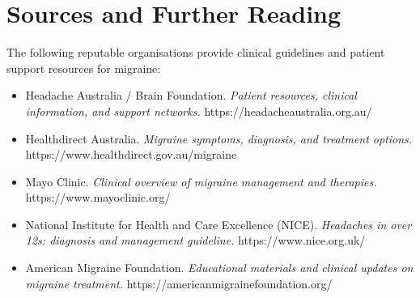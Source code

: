 \section*{Sources and Further Reading}
The following reputable organisations provide clinical guidelines and patient support resources for migraine:
\begin{itemize}
    \item Headache Australia / Brain Foundation. \textit{Patient resources, clinical information, and support networks.} https://headacheaustralia.org.au/
    \item Healthdirect Australia. \textit{Migraine symptoms, diagnosis, and treatment options.} https://www.healthdirect.gov.au/migraine
    \item Mayo Clinic. \textit{Clinical overview of migraine management and therapies.} https://www.mayoclinic.org/
    \item National Institute for Health and Care Excellence (NICE). \textit{Headaches in over 12s: diagnosis and management guideline.} https://www.nice.org.uk/
    \item American Migraine Foundation. \textit{Educational materials and clinical updates on migraine treatment.} https://americanmigrainefoundation.org/
\end{itemize}

\clearpage
